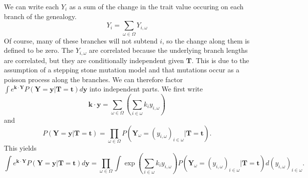 We can write each $Y_i$ as a sum of the change in the trait value
occuring on each branch of the genealogy.
\begin{equation}
  Y_i = \sum_{\omega \in \Omega} Y_{i,\omega}
\end{equation}
Of course, many of these branches will not subtend $i$, so the change
along them is defined to be zero. The $Y_{i,\omega}$ are correlated
because the underlying branch lengths are correlated, but they are
conditionally independent given $\mathbf{T}$. This is due to the
assumption of a stepping stone mutation model and that mutations occur
as a poisson process along the branches. We can therefore factor $\int
e^{\mathbf{k} \cdot \mathbf{Y}} P(\mathbf{Y}=\mathbf{y}
|\mathbf{T}=\mathbf{t}) d\mathbf{y}$ into independent parts. We first write
\begin{equation}
  \mathbf{k} \cdot \mathbf{y} = \sum_{\omega \in \Omega}\left( \sum_{i \in \omega} k_iy_{i,\omega}\right)
\end{equation}
and
\begin{equation}
  P(\mathbf{Y}=\mathbf{y}|\mathbf{T}=\mathbf{t}) = \prod_{\omega \in \Omega}
  P(\mathbf{Y}_{\omega}=(y_{i,\omega})_{i \in \omega} | \mathbf{T}=\mathbf{t}).
\end{equation}
This yields
\begin{equation} \label{eq:factor}
  \int e^{\mathbf{k} \cdot \mathbf{Y}} P(\mathbf{Y}=\mathbf{y} |\mathbf{T}=\mathbf{t}) d\mathbf{y} =
  \prod_{\omega \in \Omega}\int \exp\left(\sum_{i \in \omega}k_iy_{i,\omega}\right)
  P(\mathbf{Y}_{\omega}=(y_{i,\omega})_{i \in \omega} | \mathbf{T}=\mathbf{t})d(y_{i,\omega})_{i \in \omega}.
\end{equation}

